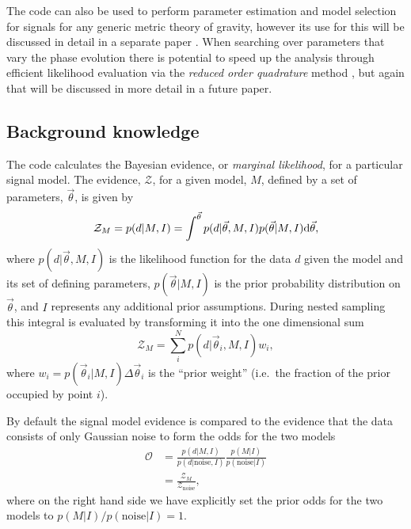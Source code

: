 The code can also be used to perform parameter estimation and model selection for signals for any generic
metric theory of gravity, however its use for this will be discussed in detail in a separate paper \citep{MaxCWpolariations}. When
searching over parameters that vary the phase evolution there is potential to speed up the analysis through
efficient likelihood evaluation via the {\it reduced order quadrature} method \citep[see, e.g.,][]{2014PhRvX...4c1006F,2015PhRvL.114g1104C},
but again that will be discussed in more detail in a future paper.

\subsection{Background knowledge}\label{sec:general}

The code calculates the Bayesian evidence, or {\it marginal likelihood}, for a particular signal model. The
evidence, $\mathcal{Z}$, for a given model, $M$, defined by a set of parameters, $\vec{\theta}$, is given by
\begin{equation}\label{eq:evidence}
\mathcal{Z}_M = p(d|M,I) = \int^{\vec{\theta}} p(d|\vec{\theta},M,I)p(\vec{\theta}|M,I) {\rm d}\vec{\theta},
\end{equation}
where $p(d|\vec{\theta},M,I)$ is the likelihood function for the data $d$ given the
model and its set of defining parameters, $p(\vec{\theta}|M,I)$ is the prior probability distribution on
$\vec{\theta}$, and $I$ represents any additional prior assumptions. During nested sampling this integral is evaluated by transforming it into the one dimensional
sum
\begin{equation}\label{eq:nestedsampev}
\mathcal{Z}_M = \sum_i^N p(d|\vec{\theta}_i,M,I) w_i,
\end{equation}
where $w_i = p(\vec{\theta}_i|M,I) \Delta\vec{\theta}_i$ is the ``prior weight''
(i.e.\ the fraction of the prior occupied by point $i$).

By default the signal model evidence is compared to the evidence that the data consists of only Gaussian noise to form the odds for the two models
\begin{align}\label{eq:oddsratio}
\mathcal{O} &= \frac{p(d|M,I)}{p(d|\text{noise},I)}\frac{p(M|I)}{p(\text{noise}|I)} \nonumber \\
&= \frac{\mathcal{Z}_M}{\mathcal{Z}_{\text{noise}}},
\end{align}
where on the right hand side we have explicitly set the prior odds for the two models to
$p(M|I)/p(\text{noise}|I) = 1$.

